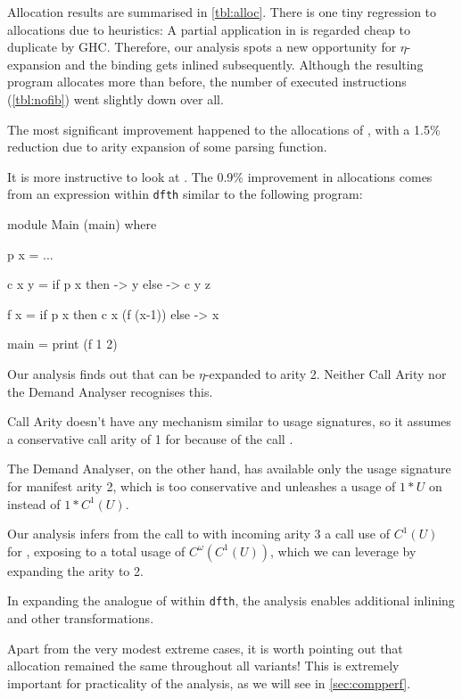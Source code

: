 Allocation results are summarised in \cref{tbl:alloc}.
There is one tiny regression to allocations due to heuristics:
A partial application in  is regarded cheap to duplicate by GHC.
Therefore, our analysis spots a new opportunity for $\eta$-expansion and the binding gets inlined subsequently.
Although the resulting program allocates more than before, the number of executed instructions (\cf \cref{tbl:nofib}) went slightly down over all.

The most significant improvement happened to the allocations of , with a 1.5\% reduction due to arity expansion of some parsing function.

It is more instructive to look at . 
The 0.9\% improvement in allocations comes from an expression within \texttt{dfth} similar to the following program:
\begin{haskellcode}
  module Main (main) where

  p x = ...

  c x y = 
    if p x 
    then \z -> y 
    else \z -> c y z
  
  f x = 
    if p x 
    then c x (f (x-1))
    else \z -> x

  main = 
    print (f 1 2)
\end{haskellcode}

Our analysis finds out that  can be $\eta$-expanded to arity 2.
Neither Call Arity nor the Demand Analyser recognises this.

Call Arity doesn't have any mechanism similar to usage signatures, so it assumes a conservative call arity of 1 for  because of the call .

The Demand Analyser, on the other hand, has available only the usage signature for manifest arity 2, which is too conservative and unleashes a usage of $1*U$ on  instead of $1*C^1(U)$.

Our analysis infers from the call to  with incoming arity 3 a call use of $C^1(U)$ for , exposing  to a total usage of $C^\omega(C^1(U))$, which we can leverage by expanding the arity to 2.

In expanding the analogue of  within \texttt{dfth}, the analysis enables additional inlining and other transformations.
\smallskip

Apart from the very modest extreme cases, it is worth pointing out that allocation remained the same throughout all variants!
This is extremely important for practicality of the analysis, as we will see in \cref{sec:compperf}.

